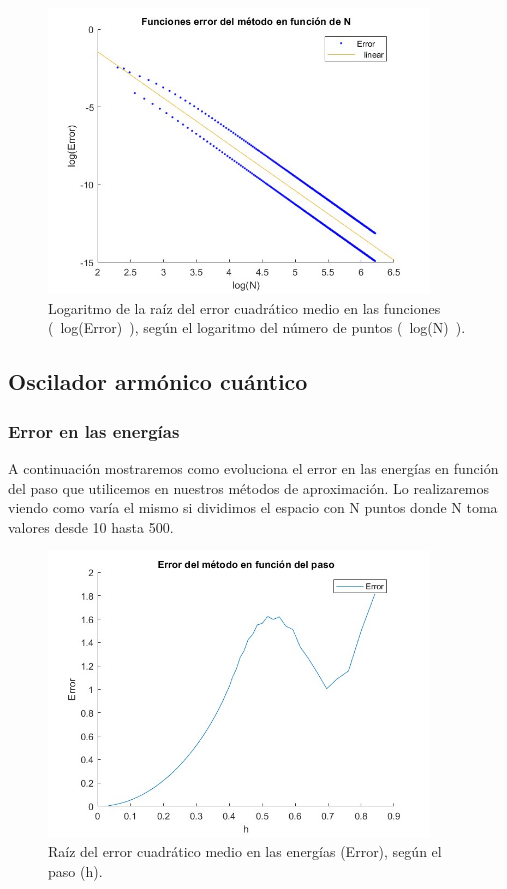 \documentclass[12pt]{article}
\begin{document}
    \begin{figure}[H]
        \centering
        \includegraphics[width=0.9\textwidth]{fotos/logerror_funci_infinito_500.jpg}
        \caption{Logaritmo de la raíz del error cuadrático medio en las funciones (~log(Error)~), según el logaritmo del número de puntos (~log(N)~).}
        \end{figure}
    
    \subsection{Oscilador armónico cuántico}

    \subsubsection{Error en las energías}

    A continuación mostraremos como evoluciona el error en las energías en función del paso que utilicemos en nuestros métodos de aproximación. Lo realizaremos viendo como varía el mismo si dividimos el espacio con N puntos donde N toma valores desde 10 hasta 500.
    
    \begin{figure}[H]
        \centering
        \includegraphics[width=0.9\textwidth]{errorpasoN500.jpg}
        \caption{Raíz del error cuadrático medio en las energías (Error), según el paso (h).}
        \end{figure} 
        
\end{document}
